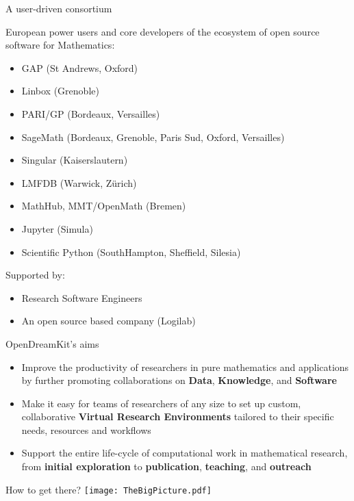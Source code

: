 \documentclass{beamer}
\begin{document}
\begin{frame}{A user-driven consortium}

  {European power users and core developers of the
      ecosystem of open source software for Mathematics:}
    \begin{itemize}
    \item GAP (St Andrews, Oxford)
    \item Linbox (Grenoble)
    \item PARI/GP (Bordeaux, Versailles)
    \item SageMath (Bordeaux, Grenoble, Paris Sud, Oxford, Versailles)
    \item Singular (Kaiserslautern)
    \item LMFDB (Warwick, Zürich)
    \item MathHub, MMT/OpenMath (Bremen)
    \item Jupyter (Simula)
    \item Scientific Python (SouthHampton, Sheffield, Silesia)
    \end{itemize}
  \pause\medskip
  \begin{block}{Supported by:}
    \begin{itemize}
    \item Research Software Engineers
    \item An open source based company (Logilab)
    \end{itemize}
  \end{block}
\end{frame}

\begin{frame}{OpenDreamKit's aims}
  \begin{itemize}
  \item Improve the productivity of researchers in pure mathematics and
    applications by further promoting collaborations on \textbf{Data},
    \textbf{Knowledge}, and \textbf{Software}
  \item Make it easy for teams of researchers of any size to set up
    custom, collaborative \textbf{Virtual Research Environments}
    tailored to their specific needs, resources and workflows
  \item Support the entire life-cycle of computational work in
    mathematical research, from \textbf{initial exploration} to
    \textbf{publication}, \textbf{teaching}, and \textbf{outreach}
  \end{itemize}
\end{frame}

\begin{frame}{How to get there?}
  \texttt{[image: TheBigPicture.pdf]}
\end{frame}
\end{document}

